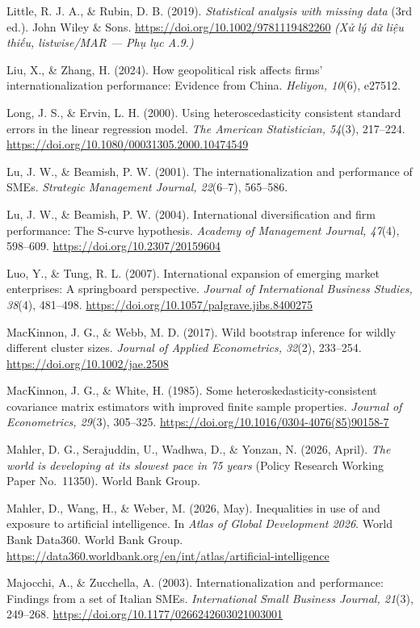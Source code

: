 \documentclass[
  a4paper,
  13pt]{extreport}
\begin{document}
Little, R. J. A., \& Rubin, D. B. (2019). \emph{Statistical analysis
with missing data} (3rd ed.). John Wiley \& Sons.
\url{https://doi.org/10.1002/9781119482260} \emph{(Xử lý dữ liệu thiếu,
listwise/MAR --- Phụ lục A.9.)}

Liu, X., \& Zhang, H. (2024). How geopolitical risk affects firms'
internationalization performance: Evidence from China. \emph{Heliyon,
10}(6), e27512.

Long, J. S., \& Ervin, L. H. (2000). Using heteroscedasticity consistent
standard errors in the linear regression model. \emph{The American
Statistician, 54}(3), 217--224.
\url{https://doi.org/10.1080/00031305.2000.10474549}

Lu, J. W., \& Beamish, P. W. (2001). The internationalization and
performance of SMEs. \emph{Strategic Management Journal, 22}(6--7),
565--586.

Lu, J. W., \& Beamish, P. W. (2004). International diversification and
firm performance: The S-curve hypothesis. \emph{Academy of Management
Journal, 47}(4), 598--609. \url{https://doi.org/10.2307/20159604}

Luo, Y., \& Tung, R. L. (2007). International expansion of emerging
market enterprises: A springboard perspective. \emph{Journal of
International Business Studies, 38}(4), 481--498.
\url{https://doi.org/10.1057/palgrave.jibs.8400275}

MacKinnon, J. G., \& Webb, M. D. (2017). Wild bootstrap inference for
wildly different cluster sizes. \emph{Journal of Applied Econometrics,
32}(2), 233--254. \url{https://doi.org/10.1002/jae.2508}

MacKinnon, J. G., \& White, H. (1985). Some
heteroskedasticity-consistent covariance matrix estimators with improved
finite sample properties. \emph{Journal of Econometrics, 29}(3),
305--325. \url{https://doi.org/10.1016/0304-4076(85)90158-7}

Mahler, D. G., Serajuddin, U., Wadhwa, D., \& Yonzan, N. (2026, April).
\emph{The world is developing at its slowest pace in 75 years} (Policy
Research Working Paper No.~11350). World Bank Group.

Mahler, D., Wang, H., \& Weber, M. (2026, May). Inequalities in use of
and exposure to artificial intelligence. In \emph{Atlas of Global
Development 2026}. World Bank Data360. World Bank Group.
\url{https://data360.worldbank.org/en/int/atlas/artificial-intelligence}

Majocchi, A., \& Zucchella, A. (2003). Internationalization and
performance: Findings from a set of Italian SMEs. \emph{International
Small Business Journal, 21}(3), 249--268.
\url{https://doi.org/10.1177/0266242603021003001}
\end{document}

